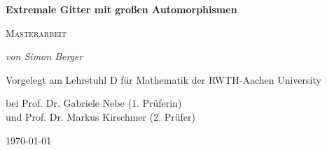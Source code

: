 \documentclass[12pt,a4paper,halfparskip,headsepline,bibtotocnumbered]{scrreprt}
\theoremstyle{nummermitklammern}
\theoremstyle{nonumberbreak}
\begin{document}

\begin{titlepage}
	\centering
	\vspace*{2cm}
	{\Large\bfseries Extremale Gitter mit großen Automorphismen\par}
	\vspace{1cm}
	{\scshape\Large Masterarbeit\par}
	\vspace{2cm}
	{\Large\itshape von Simon Berger\par}
	\vfill
	Vorgelegt am Lehrstuhl D für Mathematik der RWTH-Aachen University\par 
	bei Prof. Dr. Gabriele Nebe (1. Prüferin)\\ 
	und Prof. Dr. Markus Kirschmer (2. Prüfer)\par
	\vfill

	{\large \today\par}
\end{titlepage}


\tableofcontents

\end{document}
